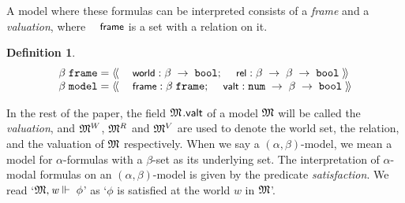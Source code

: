 \documentclass{llncs}
\newtheorem{defn}{Definition}[chapter]
\newenvironment{holmath}{\begin{displaymath}\begin{array}{l}}{\end{array}\end{displaymath}\ignorespacesafterend}
\renewcommand{\HOLConst}[1]{{\textsf{\upshape\small #1}}}
\renewcommand{\HOLinline}[1]{\ensuremath{#1}}
\renewcommand{\HOLFieldName}[1]{\HOLConst{#1}}
\renewcommand{\HOLTokenLeftrec}{\ensuremath{\langle\!\langle}}
\renewcommand{\HOLTokenRightrec}{\ensuremath{\rangle\!\rangle}}
\begin{document}
A model where these formulas can be interpreted consists of a \emph{frame} and a \emph{valuation}, where \HOLinline{\HOLConst{frame}} is a set with a relation on it. 
\begin{defn}
{\upshape\cite[Definition 1.19]{Blackburn}}
\begin{holmath}
  \ensuremath{\beta}\;\HOLTyOp{frame} = \HOLTokenLeftrec{}\;\HOLFieldName{world}\;{:}\;\ensuremath{\beta}\;\ensuremath{\rightarrow}\;\HOLTyOp{bool};\;\HOLFieldName{rel}\;{:}\;\ensuremath{\beta}\;\ensuremath{\rightarrow}\;\ensuremath{\beta}\;\ensuremath{\rightarrow}\;\HOLTyOp{bool}\;\HOLTokenRightrec{}\\
  \ensuremath{\beta}\;\HOLTyOp{model} = \HOLTokenLeftrec{}\;\HOLFieldName{frame}\;{:}\;\ensuremath{\beta}\;\HOLTyOp{frame};\;\HOLFieldName{valt}\;{:}\;\HOLTyOp{num}\;\ensuremath{\rightarrow}\;\ensuremath{\beta}\;\ensuremath{\rightarrow}\;\HOLTyOp{bool}\;\HOLTokenRightrec{}
\end{holmath}
\end{defn}
In the rest of the paper, the field \HOLinline{\HOLFreeVar{\ensuremath{\mathfrak{M}}}}$.\sf valt$ of a model \HOLinline{\HOLFreeVar{\ensuremath{\mathfrak{M}}}} will be called the \emph{valuation}, and \HOLinline{\HOLFreeVar{\ensuremath{\mathfrak{M}}}\HOLSymConst{\ensuremath{\sp{W}}}}, \HOLinline{\HOLFreeVar{\ensuremath{\mathfrak{M}}}\HOLSymConst{\ensuremath{\sp{R}}}} and \HOLinline{\HOLFreeVar{\ensuremath{\mathfrak{M}}}\HOLSymConst{\ensuremath{\sp{V}}}} are used to denote the world set, the relation, and the valuation of \HOLinline{\HOLFreeVar{\ensuremath{\mathfrak{M}}}} respectively.  When we say a $(\HOLinline{\ensuremath{\alpha}},\HOLinline{\ensuremath{\beta}})$-model, we mean a model for $\alpha$-formulas with a $\beta$-set as its underlying set. The interpretation of $\alpha$-modal formulas on an $(\HOLinline{\ensuremath{\alpha}},\HOLinline{\ensuremath{\beta}})$-model is given by the predicate \emph{satisfaction}. We read `\HOLinline{\HOLFreeVar{\ensuremath{\mathfrak{M}}},\HOLFreeVar{w}\ensuremath{\Vdash}\;\HOLFreeVar{\ensuremath{\phi}}}' as `$\phi$ is satisfied at the world $w$ in \HOLinline{\HOLFreeVar{\ensuremath{\mathfrak{M}}}}'.
\end{document}
